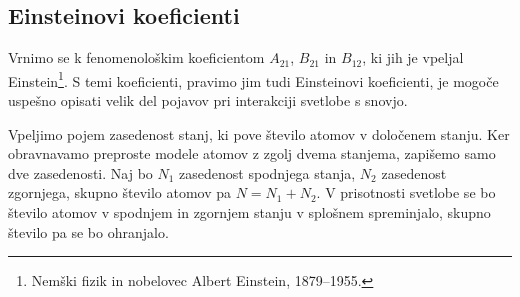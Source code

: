 \subsection*{Einsteinovi koeficienti}
\label{AB}
Vrnimo se k fenomenološkim koeficientom $A_{21}$, $B_{21}$ in $B_{12}$, ki jih je 
vpeljal Einstein\footnote{Nemški fizik in nobelovec Albert Einstein, 1879--1955.}. 
S temi koeficienti, pravimo jim tudi Einsteinovi koeficienti, 
je mogoče uspešno opisati velik del pojavov pri interakciji svetlobe s snovjo.

Vpeljimo pojem zasedenost stanj, ki pove število 
atomov v določenem stanju. Ker obravnavamo preproste modele atomov z zgolj 
dvema stanjema, zapišemo samo dve zasedenosti. Naj bo $N_1$ zasedenost 
spodnjega stanja, $N_{2}$ zasedenost zgornjega, skupno število atomov pa
$N=N_1+N_2$. V prisotnosti svetlobe 
se bo število atomov v spodnjem in zgornjem stanju v splošnem spreminjalo, skupno 
število pa se bo ohranjalo.

